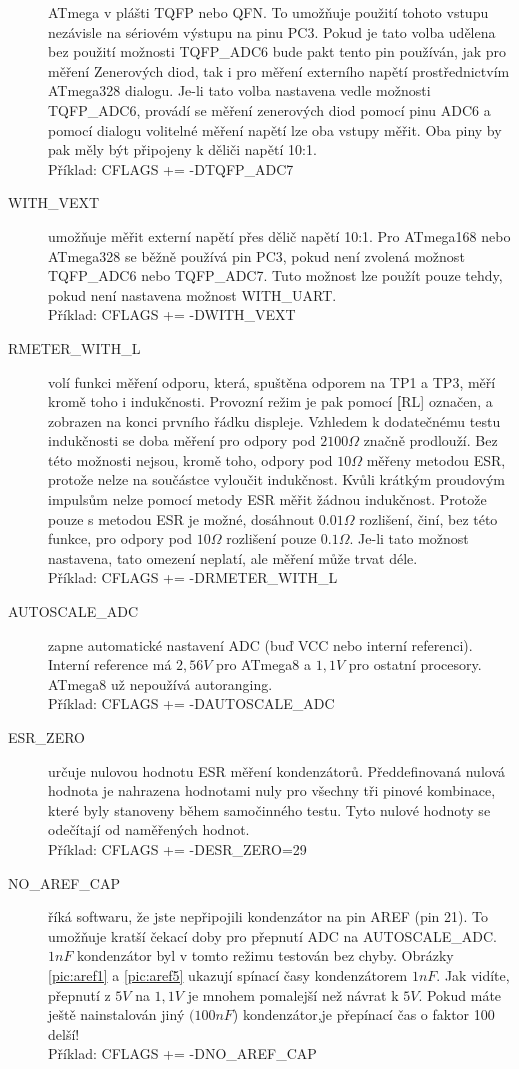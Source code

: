 \begin{description}
ATmega v plášti TQFP nebo QFN.
To umožňuje použití tohoto vstupu nezávisle na sériovém výstupu na pinu PC3.
Pokud je tato volba udělena bez použití možnosti TQFP\_ADC6 bude pakt tento pin používán,
jak pro měření Zenerových diod, tak i pro měření externího napětí prostřednictvím ATmega328 dialogu.
Je-li tato volba nastavena vedle možnosti TQFP\_ADC6, provádí se měření zenerových diod
pomocí pinu ADC6 a  pomocí dialogu volitelné měření napětí lze oba vstupy měřit.
Oba piny by pak měly být připojeny k děliči napětí 10:1.\\
Příklad: CFLAGS += -DTQFP\_ADC7
  \item[WITH\_VEXT]  umožňuje měřit externí napětí přes dělič napětí 10:1.
Pro ATmega168 nebo ATmega328 se běžně používá pin PC3,
pokud není zvolená možnost TQFP\_ADC6 nebo TQFP\_ADC7.
Tuto možnost lze použít pouze tehdy, pokud není nastavena možnost WITH\_UART.\\
Příklad: CFLAGS += -DWITH\_VEXT 
  \item[RMETER\_WITH\_L] volí funkci měření odporu, která, spuštěna odporem na TP1 a TP3,
měří kromě toho i indukčnosti.
Provozní režim je pak pomocí {\textbf[RL]} označen, a zobrazen na konci prvního řádku displeje.
Vzhledem k dodatečnému testu indukčnosti se doba měření pro odpory pod \(2100\Omega\) značně prodlouží.
Bez této možnosti nejsou, kromě toho, odpory pod \(10\Omega\) měřeny metodou ESR,
protože  nelze na součástce vyloučit indukčnost.
Kvůli krátkým proudovým impulsům nelze pomocí metody ESR měřit žádnou indukčnost.
Protože pouze s metodou ESR je možné, dosáhnout \(0.01\Omega\) rozlišení, činí, bez této funkce,
pro odpory pod \(10\Omega\) rozlišení pouze \(0.1\Omega\).
Je-li tato možnost nastavena, tato omezení neplatí, ale měření může trvat déle.\\
Příklad: CFLAGS += -DRMETER\_WITH\_L
  \item[AUTOSCALE\_ADC] zapne automatické nastavení ADC (buď VCC nebo interní referenci).
Interní reference má \(2,56V\) pro ATmega8 a \(1,1V\) pro ostatní procesory.
ATmega8 už nepoužívá autoranging.\\
Příklad: CFLAGS += -DAUTOSCALE\_ADC
  \item[ESR\_ZERO] určuje nulovou hodnotu ESR měření kondenzátorů.
Předdefinovaná nulová hodnota je nahrazena hodnotami nuly pro všechny tři pinové kombinace,
které byly stanoveny během samočinného testu.
Tyto nulové hodnoty se odečítají od naměřených hodnot.\\
Příklad: CFLAGS += -DESR\_ZERO=29
  \item[NO\_AREF\_CAP]  říká softwaru, že jste nepřipojili kondenzátor na pin AREF (pin 21).
To umožňuje kratší čekací doby pro přepnutí ADC na AUTOSCALE\_ADC.
\(1nF\) kondenzátor byl v tomto režimu testován bez chyby.
Obrázky \ref{pic:aref1} a \ref{pic:aref5} ukazují spínací časy kondenzátorem \(1nF\).
Jak vidíte, přepnutí z \(5V\) na \(1,1V\) je mnohem pomalejší než návrat k \(5V\).
Pokud máte ještě nainstalován jiný \((100nF\)) kondenzátor,je přepínací čas o faktor 100 delší!\\
Příklad: CFLAGS += -DNO\_AREF\_CAP
\end{description}

